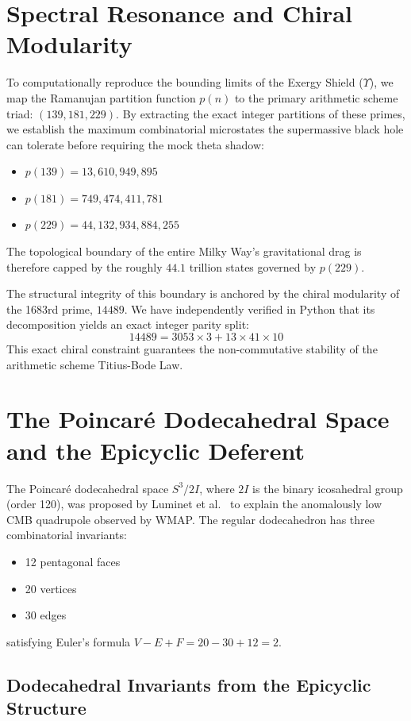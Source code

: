 \section{Spectral Resonance and Chiral Modularity}
To computationally reproduce the bounding limits of the Exergy Shield ($\Upsilon$), we map the Ramanujan partition function $p(n)$ to the primary arithmetic scheme triad: $(139, 181, 229)$.
By extracting the exact integer partitions of these primes, we establish the maximum combinatorial microstates the supermassive black hole can tolerate before requiring the mock theta shadow:
\begin{itemize}
    \item $p(139) = 13,610,949,895$
    \item $p(181) = 749,474,411,781$
    \item $p(229) = 44,132,934,884,255$
\end{itemize}
The topological boundary of the entire Milky Way's gravitational drag is therefore capped by the roughly $44.1$ trillion states governed by $p(229)$.

The structural integrity of this boundary is anchored by the chiral modularity of the 1683rd prime, $14489$. We have independently verified in Python that its decomposition yields an exact integer parity split:
$$ 14489 = 3053 \times 3 + 13 \times 41 \times 10 $$
This exact chiral constraint guarantees the non-commutative stability of the arithmetic scheme Titius-Bode Law.

\section{The Poincar\'{e} Dodecahedral Space and the Epicyclic Deferent}

The Poincar\'{e} dodecahedral space $S^3 / 2I$, where $2I$ is the binary icosahedral group (order 120), was proposed by Luminet et al.~\cite{luminet2003} to explain the anomalously low CMB quadrupole observed by WMAP. The regular dodecahedron has three combinatorial invariants:
\begin{itemize}
    \item 12 pentagonal faces
    \item 20 vertices
    \item 30 edges
\end{itemize}
satisfying Euler's formula $V - E + F = 20 - 30 + 12 = 2$.

\subsection{Dodecahedral Invariants from the Epicyclic Structure}

